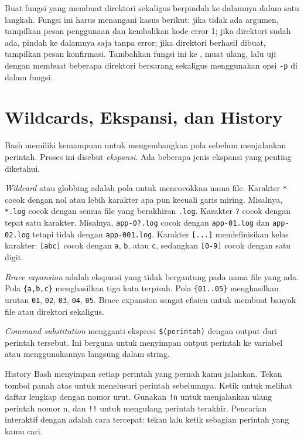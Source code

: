 \begin{challengebox}
Buat fungsi  yang membuat direktori sekaligus berpindah ke
dalamnya dalam satu langkah. Fungsi ini harus menangani kasus berikut:
jika tidak ada argumen, tampilkan pesan penggunaan dan kembalikan kode
error 1; jika direktori sudah ada, pindah ke dalamnya saja tanpa error;
jika direktori berhasil dibuat, tampilkan pesan konfirmasi. Tambahkan
fungsi ini ke , muat ulang, lalu uji dengan membuat
beberapa direktori bersarang sekaligus menggunakan opsi \texttt{-p} di
dalam fungsi.
\end{challengebox}

\section{Wildcards, Ekspansi, dan History}
\label{sec:wildcards-ekspansi-history}

Bash memiliki kemampuan untuk mengembangkan pola sebelum menjalankan
perintah. Proses ini disebut \textit{ekspansi}. Ada beberapa jenis
ekspansi yang penting diketahui.

\textit{Wildcard} atau globbing adalah pola untuk mencocokkan nama file.
Karakter \texttt{*} cocok dengan nol atau lebih karakter apa pun kecuali
garis miring. Misalnya, \texttt{*.log} cocok dengan semua file yang
berakhiran \texttt{.log}. Karakter \texttt{?} cocok dengan tepat satu
karakter. Misalnya, \texttt{app-0?.log} cocok dengan \texttt{app-01.log}
dan \texttt{app-02.log} tetapi tidak dengan \texttt{app-001.log}. Karakter
\texttt{[...]} mendefinisikan kelas karakter: \texttt{[abc]} cocok dengan
\texttt{a}, \texttt{b}, atau \texttt{c}, sedangkan \texttt{[0-9]} cocok
dengan satu digit.

\textit{Brace expansion} adalah ekspansi yang tidak bergantung pada nama
file yang ada. Pola \texttt{\{a,b,c\}} menghasilkan tiga kata terpisah.
Pola \texttt{\{01..05\}} menghasilkan urutan \texttt{01}, \texttt{02},
\texttt{03}, \texttt{04}, \texttt{05}. Brace expansion sangat efisien
untuk membuat banyak file atau direktori sekaligus.

\textit{Command substitution} mengganti ekspresi \texttt{\$(perintah)}
dengan output dari perintah tersebut. Ini berguna untuk menyimpan output
perintah ke variabel atau menggunakannya langsung dalam string.

History Bash menyimpan setiap perintah yang pernah kamu jalankan.
Tekan tombol panah atas untuk menelusuri perintah sebelumnya. Ketik
 untuk melihat daftar lengkap dengan nomor urut. Gunakan
\texttt{!n} untuk menjalankan ulang perintah nomor n, dan \texttt{!!}
untuk mengulang perintah terakhir. Pencarian interaktif dengan
 adalah cara tercepat: tekan  lalu
ketik sebagian perintah yang kamu cari.

